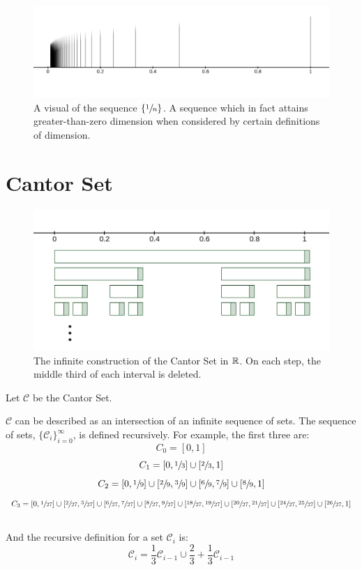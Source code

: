 \documentclass[11pt]{ekblite}
\begin{document}
\begin{figure}[h]
	\includegraphics[scale=0.25]{img/c21.jpg}
	\caption{A visual of the sequence $\{\sfrac{1}{n}\}$. A sequence which in fact attains greater-than-zero dimension when considered by certain definitions of dimension.}
\end{figure}
\newpage
\section{Cantor Set}
	\begin{figure}[h]
		\includegraphics[scale=0.3]{img/c20.jpg}
		\caption{The infinite construction of the Cantor Set in $\mathbb{R}$. On each step, the middle third of each interval is deleted.}
	\end{figure}
	Let $\mathcal{C}$ be the Cantor Set.
	\begin{definition}
        $\mathcal{C}$ can be described as an intersection of an infinite sequence of sets. The sequence of sets, $\{\mathcal{C}_i\}_{i=0}^{\infty}$, is defined recursively. For example, the first three are:
		\[C_0 = [0,1]\]
		\[C_1 = \left[0,\sfrac{1}{3}  \right] \cup \left[ \sfrac{2}{3},1\right]\]
		\[C_2 = \left[0,\sfrac{1}{9}  \right] \cup \left[ \sfrac{2}{9},\sfrac{3}{9} \right] \cup \left[\sfrac{6}{9},\sfrac{7}{9}\right] \cup \left[ \sfrac{8}{9},1\right]\]
		\[C_3 = \left[0,\sfrac{1}{27}  \right] \cup \left[\sfrac{2}{27},\sfrac{3}{27}  \right] \cup \left[\sfrac{6}{27},\sfrac{7}{27}  \right] \cup \left[\sfrac{8}{27},\sfrac{9}{27}  \right] \cup \left[\sfrac{18}{27},\sfrac{19}{27}  \right] \cup \left[\sfrac{20}{27},\sfrac{21}{27}  \right] \cup \left[\sfrac{24}{27},\sfrac{25}{27}  \right] \cup \left[\sfrac{26}{27},1  \right]\]
		\\
		And the recursive definition for a set $\mathcal{C}_i$ is:
		\[\mathcal{C}_i = \frac{1}{3}  \mathcal{C}_{i-1} \cup \frac{2}{3} + \frac{1}{3} \mathcal{C}_{i-1}\]
	\end{definition}
\end{document}
